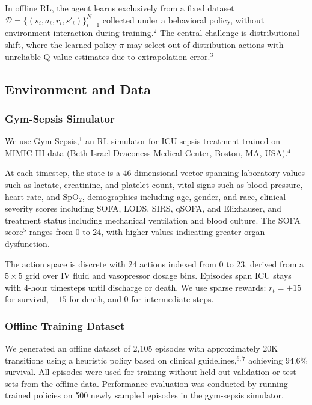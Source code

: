 In offline RL, the agent learns exclusively from a fixed dataset $\mathcal{D} = \{(s_i, a_i, r_i, s'_i)\}_{i=1}^N$ collected under a behavioral policy, without environment interaction during training.$^{2}$ The central challenge is distributional shift, where the learned policy $\pi$ may select out-of-distribution actions with unreliable Q-value estimates due to extrapolation error.$^{3}$

\subsection{Environment and Data}\label{sec:methods:env}

\subsubsection{Gym-Sepsis Simulator}

We use Gym-Sepsis,$^{1}$ an RL simulator for ICU sepsis treatment trained on MIMIC-III data (Beth Israel Deaconess Medical Center, Boston, MA, USA).$^{4}$

At each timestep, the state is a 46-dimensional vector spanning laboratory values such as lactate, creatinine, and platelet count, vital signs such as blood pressure, heart rate, and SpO$_2$, demographics including age, gender, and race, clinical severity scores including SOFA, LODS, SIRS, qSOFA, and Elixhauser, and treatment status including mechanical ventilation and blood culture. The SOFA score$^{5}$ ranges from 0 to 24, with higher values indicating greater organ dysfunction.

The action space is discrete with 24 actions indexed from 0 to 23, derived from a $5 \times 5$ grid over IV fluid and vasopressor dosage bins. Episodes span ICU stays with 4-hour timesteps until discharge or death. We use sparse rewards: $r_t = +15$ for survival, $-15$ for death, and $0$ for intermediate steps.

\subsubsection{Offline Training Dataset}

We generated an offline dataset of 2,105 episodes with approximately 20K transitions using a heuristic policy based on clinical guidelines,$^{6,7}$ achieving 94.6\% survival. All episodes were used for training without held-out validation or test sets from the offline data. Performance evaluation was conducted by running trained policies on 500 newly sampled episodes in the gym-sepsis simulator.

